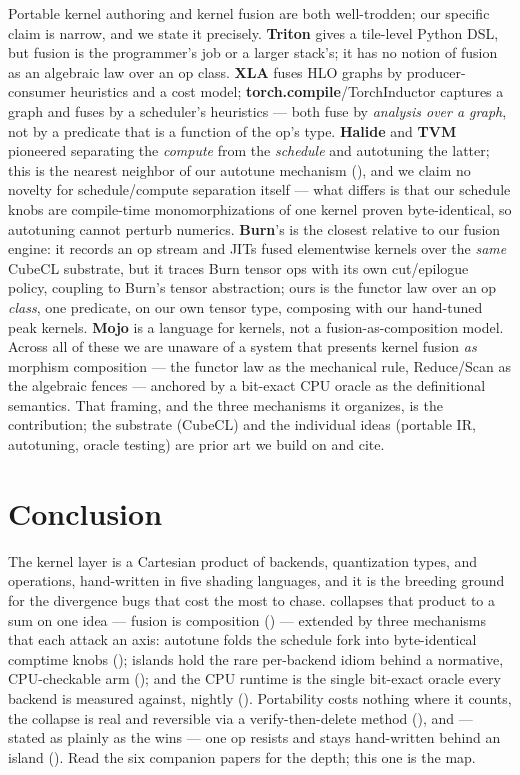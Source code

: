 \documentclass[11pt]{article}
\begin{document}
Portable kernel authoring and kernel fusion are both well-trodden; our specific claim is narrow, and we
state it precisely. \textbf{Triton} gives a tile-level Python DSL, but fusion is the programmer's job or a
larger stack's; it has no notion of fusion as an algebraic law over an op class. \textbf{XLA} fuses HLO
graphs by producer-consumer heuristics and a cost model; \textbf{torch.compile}/TorchInductor captures a
graph and fuses by a scheduler's heuristics --- both fuse by \emph{analysis over a graph}, not by a
predicate that is a function of the op's type. \textbf{Halide} and \textbf{TVM} pioneered separating the
\emph{compute} from the \emph{schedule} and autotuning the latter; this is the nearest neighbor of our
autotune mechanism (\cite{tune}), and we claim no novelty for schedule/compute separation itself --- what
differs is that our schedule knobs are compile-time monomorphizations of one kernel proven byte-identical,
so autotuning cannot perturb numerics. \textbf{Burn}'s  is the closest relative to our
fusion engine: it records an op stream and JITs fused elementwise kernels over the \emph{same} CubeCL
substrate, but it traces Burn tensor ops with its own cut/epilogue policy, coupling to Burn's tensor
abstraction; ours is the functor law over an op \emph{class}, one predicate, on our own tensor type,
composing with our hand-tuned peak kernels. \textbf{Mojo} is a language for kernels, not a
fusion-as-composition model. Across all of these we are unaware of a system that presents kernel fusion
\emph{as} morphism composition --- the functor law as the mechanical rule, Reduce/Scan as the algebraic
fences --- anchored by a bit-exact CPU oracle as the definitional semantics. That framing, and the three
mechanisms it organizes, is the contribution; the substrate (CubeCL) and the individual ideas (portable
IR, autotuning, oracle testing) are prior art we build on and cite.

\section{Conclusion}

The kernel layer is a Cartesian product of backends, quantization types, and operations, hand-written in
five shading languages, and it is the breeding ground for the divergence bugs that cost the most to chase.
\hk{} collapses that product to a sum on one idea --- fusion is composition (\cite{fuse}) --- extended by
three mechanisms that each attack an axis: autotune folds the schedule fork into byte-identical comptime
knobs (\cite{tune}); islands hold the rare per-backend idiom behind a normative, CPU-checkable arm
(\cite{island}); and the CPU runtime is the single bit-exact oracle every backend is measured against,
nightly (\cite{oracle}). Portability costs nothing where it counts, the collapse is real and reversible via
a verify-then-delete method (\cite{method}), and --- stated as plainly as the wins --- one op resists and
stays hand-written behind an island (\cite{mmq}). Read the six companion papers for the depth; this one is
the map.
\end{document}
